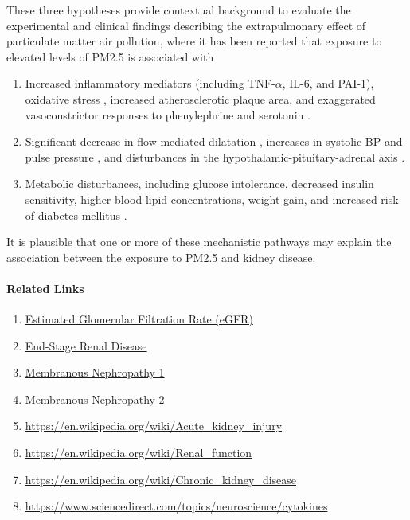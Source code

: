 \documentclass[11pt]{article}
\begin{document}
 These three hypotheses provide contextual background to evaluate the experimental and clinical findings describing the extrapulmonary effect of particulate matter air pollution, where it has been reported that exposure to elevated levels of PM2.5 is associated with \citep{bowe2018particulate}
 \begin{enumerate}
     \item Increased inflammatory mediators (including TNF-$\alpha$, IL-6, and PAI-1), oxidative stress \citep{ostro2014chronic, ruckerl2014associations, sorensen2003personal}, increased atherosclerotic plaque area, and exaggerated vasoconstrictor responses to phenylephrine and serotonin \citep{sun2005long}.
     \item Significant decrease in flow-mediated dilatation \citep{krishnan2012vascular, wilker2014relation}, increases in systolic BP and pulse pressure \citep{auchincloss2008associations, fuks2014arterial, fuks2011long}, and disturbances in the hypothalamic-pituitary-adrenal axis \citep{thomson2013mapping}.
     \item  Metabolic disturbances, including glucose intolerance, decreased insulin sensitivity, higher blood lipid concentrations, weight gain, and increased risk of diabetes mellitus \citep{wei2016chronic, chen2016ambient, wolf2016association}.
 \end{enumerate}
 
It is plausible that one or more of these mechanistic pathways may explain the association between the exposure to PM2.5 and kidney disease.

\paragraph{Related Links}

\begin{enumerate}
    \item \href{https://labtestsonline.org/tests/estimated-glomerular-filtration-rate-egfr}{Estimated Glomerular Filtration Rate (eGFR)}
    \item \href{https://www.mayoclinic.org/diseases-conditions/end-stage-renal-disease/symptoms-causes/syc-20354532}{End-Stage Renal Disease}
    \item \href{https://unckidneycenter.org/kidneyhealthlibrary/glomerular-disease/membranous-nephropathy/}{Membranous Nephropathy 1}
    \item \href{https://www.mayoclinic.org/diseases-conditions/membranous-nephropathy/symptoms-causes/syc-20365189}{Membranous Nephropathy 2}
    \item \url{https://en.wikipedia.org/wiki/Acute_kidney_injury}
    \item \url{https://en.wikipedia.org/wiki/Renal_function}
    \item \url{https://en.wikipedia.org/wiki/Chronic_kidney_disease}
    \item \url{https://www.sciencedirect.com/topics/neuroscience/cytokines}
\end{enumerate}




\end{document}
